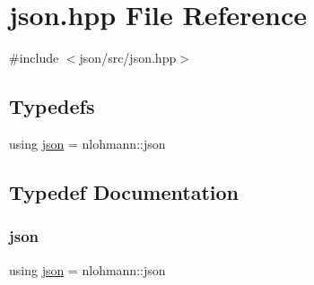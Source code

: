 \hypertarget{a00011}{}\section{json.\+hpp File Reference}
\label{a00011}
{\ttfamily \#include $<$json/src/json.\+hpp$>$}\newline
\subsection*{Typedefs}
\begin{DoxyCompactItemize}
\item 
using \hyperlink{a00011_ab701e3ac61a85b337ec5c1abaad6742d}{json} = nlohmann\+::json
\end{DoxyCompactItemize}


\subsection{Typedef Documentation}
\mbox{\label{a00011_ab701e3ac61a85b337ec5c1abaad6742d}} 
\subsubsection{\texorpdfstring{json}{json}}
{\footnotesize\ttfamily using \hyperlink{a00011_ab701e3ac61a85b337ec5c1abaad6742d}{json} =  nlohmann\+::json}

